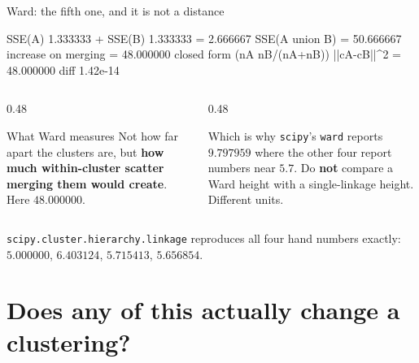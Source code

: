 \documentclass[aspectratio=169]{beamer}
\begin{document}
\begin{frame}[fragile]{Ward: the fifth one, and it is not a distance}
\begin{outblk}
SSE(A) 1.333333 + SSE(B) 1.333333 = 2.666667
SSE(A union B)                = 50.666667
increase on merging           = 48.000000
closed form (nA nB/(nA+nB)) ||cA-cB||^2 = 48.000000   diff 1.42e-14
\end{outblk}
  \begin{columns}[T]
    \begin{column}{0.48\textwidth}
      \begin{block}{What Ward measures}
        Not how far apart the clusters are, but \textbf{how much
        within-cluster scatter merging them would create}. Here $48.000000$.
      \end{block}
    \end{column}
    \begin{column}{0.48\textwidth}
      \begin{alertblock}{Which is why}
        \texttt{scipy}'s \texttt{ward} reports $9.797959$ where the other
        four report numbers near $5.7$. Do \textbf{not} compare a Ward
        height with a single-linkage height. Different units.
      \end{alertblock}
    \end{column}
  \end{columns}
  \begin{center}
    \small \texttt{scipy.cluster.hierarchy.linkage} reproduces all four hand
    numbers exactly: $5.000000$, $6.403124$, $5.715413$, $5.656854$.
  \end{center}
\end{frame}

\section[Summary]{Does any of this actually change a clustering?}
\label{sec:summary}
\end{document}
